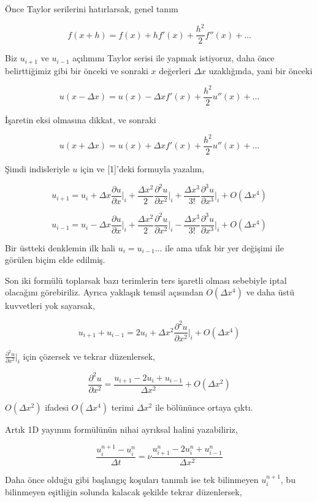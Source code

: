 \documentclass[12pt,fleqn]{article}\usepackage{../../common}
\begin{document}
Önce Taylor serilerini hatırlarsak, genel tanım

$$
f(x+h) = f(x) + h f'(x) + \frac{h^2}{2} f''(x) + ...
$$

Biz $u_{i+1}$ ve $u_{i-1}$ açılımını Taylor serisi ile yapmak istiyoruz, daha
önce belirttiğimiz gibi bir önceki ve sonraki $x$ değerleri $\Delta x$
uzaklığında, yani bir önceki

$$
u(x-\Delta x) = u(x) - \Delta x f'(x) + \frac{h^2}{2} u''(x) + ...
$$

İşaretin eksi olmasına dikkat, ve sonraki 

$$
u(x+\Delta x) = u(x) + \Delta x f'(x) + \frac{h^2}{2} u''(x) + ...
$$

Şimdi indisleriyle $u$ için ve [1]'deki formuyla yazalım,

$$
u_{i+1} = u_i + \Delta x \frac{\partial u}{\partial x}\bigg|_i +
\frac{\Delta x^2}{2} \frac{\partial ^2 u}{\partial x^2}\bigg|_i +
\frac{\Delta x^3}{3!} \frac{\partial ^3 u}{\partial x^3}\bigg|_i +
O(\Delta x^4)
$$

$$
u_{i-1} = u_i - \Delta x \frac{\partial u}{\partial x}\bigg|_i +
\frac{\Delta x^2}{2} \frac{\partial ^2 u}{\partial x^2}\bigg|_i -
\frac{\Delta x^3}{3!} \frac{\partial ^3 u}{\partial x^3}\bigg|_i +
O(\Delta x^4)
$$

Bir üstteki denklemin ilk hali $u_i = u_{i-1} ... $ ile ama ufak bir yer
değişimi ile görülen biçim elde edilmiş. 

Son iki formülü toplarsak bazı terimlerin ters işaretli olması sebebiyle iptal
olacağını görebiriliz. Ayrıca yaklaşık temsil açısından $O(\Delta x^4)$ ve daha
üstü kuvvetleri yok sayarsak, 

$$
u_{i+1} + u_{i-1} =
2u_i+\Delta x^2 \frac{\partial ^2 u}{\partial x^2}\bigg|_i +
O(\Delta x^4)
$$

$\frac{\partial ^2 u}{\partial x^2}\bigg|_i$ için çözersek ve tekrar düzenlersek,

$$
\frac{\partial ^2 u}{\partial x^2}=\frac{u_{i+1}-2u_{i}+u_{i-1}}{\Delta x^2} + O(\Delta x^2)
$$

$O(\Delta x^2)$ ifadesi $O(\Delta x^4)$ terimi $\Delta x^2$ ile bölününce ortaya çıktı.

Artık 1D yayınım formülünün nihai ayrıksal halini yazabiliriz,

$$
\frac{u_{i}^{n+1}-u_{i}^{n}}{\Delta t} =
\nu\frac{u_{i+1}^{n}-2u_{i}^{n}+u_{i-1}^{n}}{\Delta x^2}
$$

Daha önce olduğu gibi başlangıç koşuları tanımlı ise tek bilinmeyen
$u_{i}^{n+1}$, bu bilinmeyen eşitliğin solunda kalacak şekilde tekrar
düzenlersek,
\end{document}
